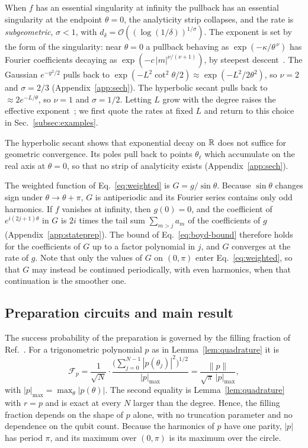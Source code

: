 When $f$ has an essential
singularity at infinity the pullback has an essential singularity
at the endpoint $\theta=0$, the analyticity strip collapses, and
the rate is \emph{subgeometric}, $\sigma<1$, with
$d_\delta=\mathcal{O}((\log(1/\delta))^{1/\sigma})$.  The exponent
is set by the form of the singularity: near $\theta=0$ a pullback
behaving as $\exp(-\kappa/\theta^{\,\nu})$ has Fourier coefficients
decaying as $\exp(-c\,|m|^{\nu/(\nu+1)})$, by steepest
descent~\cite[Ch.~2]{Boyd2001}.  The Gaussian $e^{-y^2/2}$ pulls
back to $\exp(-L^2\cot^2\theta/2)\approx\exp(-L^2/2\theta^2)$, so
$\nu=2$ and $\sigma=2/3$ (Appendix~\ref{app:sech}).  The hyperbolic
secant pulls back to $\approx 2e^{-L/\theta}$, so $\nu=1$ and
$\sigma=1/2$.  Letting $L$ grow with the degree raises the
effective exponent~\cite[Sec.~17.9]{Boyd2001}; we first quote the
rates at fixed $L$ and return to this choice in
Sec.~\ref{subsec:examples}.

The hyperbolic secant shows that exponential decay on $\mathbb{R}$ does
not suffice for geometric convergence.  Its poles pull back to
points $\theta_\ell$ which accumulate on the real axis at $\theta=0$,
so that no strip of analyticity exists
(Appendix~\ref{app:sech}).

The weighted function of Eq.~\eqref{eq:weighted} is
$G=g/\sin\theta$.  Because $\sin\theta$ changes sign under
$\theta\to\theta+\pi$, $G$ is antiperiodic and its Fourier series
contains only odd harmonics.  If $f$ vanishes at infinity, then
$g(0)=0$, and the coefficient of $e^{i(2j+1)\theta}$ in $G$ is $2i$
times the tail sum $\sum_{m>j}a_m$ of the coefficients of $g$
(Appendix~\ref{app:stateprep}).  The bound
of Eq.~\eqref{eq:boyd-bound} therefore holds for the
coefficients of $G$ up to a factor polynomial in $j$, and $G$
converges at the rate of $g$.  Note that only the values of $G$ on
$(0,\pi)$ enter Eq.~\eqref{eq:weighted}, so that $G$ may instead be
continued periodically, with even harmonics, when that continuation
is the smoother one.

\subsection{Preparation circuits and main result}
\label{subsec:algorithm}

The success probability of the preparation is governed by the
filling fraction of Ref.~\cite{McArdleGilyenBerta2025}.  For a
trigonometric polynomial $p$ as in Lemma~\ref{lem:quadrature} it is
\begin{equation}
	\mathcal{F}_p=\frac{1}{\sqrt{N}}\cdot
	\frac{\bigl(\sum_{j=0}^{N-1}|p(\theta_j)|^2\bigr)^{1/2}}{|p|_{\max}}
	=\frac{\|p\|}{\sqrt{\pi}\,|p|_{\max}},
	\label{eq:filling}
\end{equation}
with $|p|_{\max}=\max_\theta|p(\theta)|$.  The second equality is
Lemma~\ref{lem:quadrature} with $r=p$ and is
exact at every $N$ larger than the degree.  Hence, the filling
fraction depends on the shape of $p$ alone, with no truncation parameter and
no dependence on the qubit count.  Because the harmonics of $p$
have one parity, $|p|$ has period $\pi$, and its maximum over
$(0,\pi)$ is its maximum over the circle.

